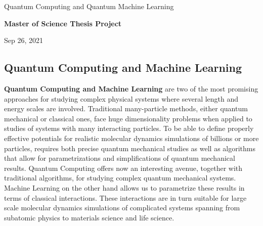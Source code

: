 \documentclass[%
oneside,                 %
final,                   %
10pt]{article}
\begin{document}

\newcommand{\exercisesection}[1]{\subsection*{#1}}






\thispagestyle{empty}

\begin{center}
{\LARGE\bf
\begin{spacing}{1.25}
Quantum Computing and Quantum Machine Learning
\end{spacing}
}
\end{center}


\begin{center}
{\bf Master of Science Thesis Project${}^{}$} \\ [0mm]
\end{center}

\begin{center}
\end{center}
    

\begin{center}
Sep 26, 2021
\end{center}

\vspace{1cm}


\subsection*{Quantum Computing and Machine Learning}



\textbf{Quantum Computing and Machine Learning} are two of the most promising
approaches for studying complex physical systems where several length
and energy scales are involved.  Traditional many-particle methods,
either quantum mechanical or classical ones, face huge dimensionality
problems when applied to studies of systems with many interacting
particles. To be able to define properly effective potentials for
realistic molecular dynamics simulations of billions or more
particles, requires both precise quantum mechanical studies as well as
algorithms that allow for parametrizations and simplifications of
quantum mechanical results. Quantum Computing offers now an
interesting avenue, together with traditional algorithms, for studying
complex quantum mechanical systems. Machine Learning on the other hand
allows us to parametrize these results in terms of classical
interactions. These interactions are in turn suitable for large scale
molecular dynamics simulations of complicated systems spanning from
subatomic physics to materials science and life science.
\end{document}

